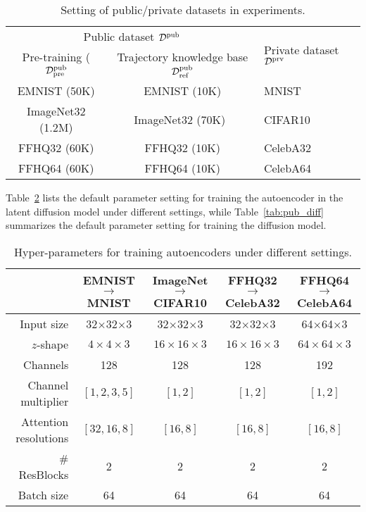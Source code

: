 \begin{table}[ht!]\small
\centering
\renewcommand{\arraystretch}{1.2}
\begin{tabular}{c|c|l}
\multicolumn{2}{c|}{Public dataset ${\mathcal{D}}^\mathrm{pub}$} & \multirow{2}{*}{Private dataset ${\mathcal{D}}^\mathrm{prv}$} \\
\cline{1-2}
Pre-training (${\mathcal{D}}^\mathrm{pub}_\mathrm{pre}$ & Trajectory knowledge base ${\mathcal{D}}^\mathrm{pub}_\mathrm{ref}$ &  \\
 \hline
 EMNIST (50K) & EMNIST (10K) &  MNIST \\
 ImageNet32 (1.2M)  &  ImageNet32 (70K)~\citep{darlow2018cinic}   & CIFAR10  \\
 FFHQ32 (60K)&FFHQ32 (10K)  & CelebA32\\
 FFHQ64 (60K)& FFHQ64 (10K) & CelebA64 \\
\end{tabular}
\caption{Setting of public/private datasets in experiments. \label{table:setting}}
\end{table}

Table~\ref{tab:autoencoder} lists the default parameter setting for training the autoencoder in the latent diffusion model under different settings, while Table~\ref{tab:pub_diff} summarizes the default parameter setting for training the diffusion model.

\begin{table}\small
\centering
\renewcommand{\arraystretch}{1.2}
\setlength{\tabcolsep}{1pt}
\begin{tabular}{r|c|c|c|c}
& EMNIST$\rightarrow$MNIST & ImageNet$\rightarrow$CIFAR10 & FFHQ32$\rightarrow$CelebA32 & FFHQ64$\rightarrow$CelebA64 \\ \hline
Input size & 32$\times$32$\times$3 & 32$\times$32$\times$3 & 32$\times$32$\times$3 & 64$\times$64$\times$3 \\ 
$z$-shape & $4 \times 4 \times 3$ & $16 \times 16 \times 3$ & $16 \times 16 \times 3$ & $64 \times 64 \times 3$ \\ 
Channels & 128 & 128 & 128 & 192 \\ 
Channel multiplier & $[1,2,3,5]$ & $[1,2]$ & $[1,2]$ & $[1,2]$ \\ 
Attention resolutions & $[32,16,8]$ & $[16,8]$ & $[16,8]$ & $[16,8]$ \\
\# ResBlocks & 2 & 2 & 2 & 2 \\ 
Batch size & 64 & 64 & 64 & 64 \\ 
\end{tabular}
\caption{Hyper-parameters for training autoencoders under different settings.}
\label{tab:autoencoder}
\end{table}

